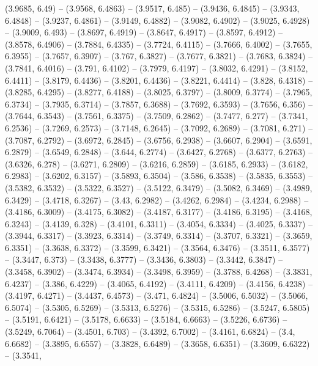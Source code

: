 {  (3.9685, 6.49) -- (3.9568, 6.4863) -- (3.9517, 6.485) -- (3.9436, 6.4845) -- 
  (3.9343, 6.4848) -- (3.9237, 6.4861) -- (3.9149, 6.4882) -- (3.9082, 6.4902) 
  -- (3.9025, 6.4928) -- (3.9009, 6.493) -- (3.8697, 6.4919) -- (3.8647, 6.4917)
   -- (3.8597, 6.4912) -- (3.8578, 6.4906) -- (3.7884, 6.4335) -- (3.7724, 
  6.4115) -- (3.7666, 6.4002) -- (3.7655, 6.3955) -- (3.7657, 6.3907) -- (3.767,
   6.3827) -- (3.7677, 6.3821) -- (3.7683, 6.3824) -- (3.7841, 6.4016) -- 
  (3.791, 6.4102) -- (3.7979, 6.4197) -- (3.8032, 6.4291) -- (3.8152, 6.4411) --
   (3.8179, 6.4436) -- (3.8201, 6.4436) -- (3.8221, 6.4414) -- (3.828, 6.4318) 
  -- (3.8285, 6.4295) -- (3.8277, 6.4188) -- (3.8025, 6.3797) -- (3.8009, 
  6.3774) -- (3.7965, 6.3734) -- (3.7935, 6.3714) -- (3.7857, 6.3688) -- 
  (3.7692, 6.3593) -- (3.7656, 6.356) -- (3.7644, 6.3543) -- (3.7561, 6.3375) --
   (3.7509, 6.2862) -- (3.7477, 6.277) -- (3.7341, 6.2536) -- (3.7269, 6.2573) 
  -- (3.7148, 6.2645) -- (3.7092, 6.2689) -- (3.7081, 6.271) -- (3.7087, 6.2792)
   -- (3.6972, 6.2845) -- (3.6756, 6.2938) -- (3.6607, 6.2904) -- (3.6591, 
  6.2879) -- (3.6549, 6.2848) -- (3.644, 6.2774) -- (3.6427, 6.2768) -- (3.6377,
   6.2763) -- (3.6326, 6.278) -- (3.6271, 6.2809) -- (3.6216, 6.2859) -- 
  (3.6185, 6.2933) -- (3.6182, 6.2983) -- (3.6202, 6.3157) -- (3.5893, 6.3504) 
  -- (3.586, 6.3538) -- (3.5835, 6.3553) -- (3.5382, 6.3532) -- (3.5322, 6.3527)
   -- (3.5122, 6.3479) -- (3.5082, 6.3469) -- (3.4989, 6.3429) -- (3.4718, 
  6.3267) -- (3.43, 6.2982) -- (3.4262, 6.2984) -- (3.4234, 6.2988) -- (3.4186, 
  6.3009) -- (3.4175, 6.3082) -- (3.4187, 6.3177) -- (3.4186, 6.3195) -- 
  (3.4168, 6.3243) -- (3.4139, 6.328) -- (3.4101, 6.3311) -- (3.4054, 6.3334) --
   (3.4025, 6.3337) -- (3.3944, 6.3317) -- (3.3923, 6.3314) -- (3.3749, 6.3314) 
  -- (3.3707, 6.3321) -- (3.3659, 6.3351) -- (3.3638, 6.3372) -- (3.3599, 
  6.3421) -- (3.3564, 6.3476) -- (3.3511, 6.3577) -- (3.3447, 6.373) -- (3.3438,
   6.3777) -- (3.3436, 6.3803) -- (3.3442, 6.3847) -- (3.3458, 6.3902) -- 
  (3.3474, 6.3934) -- (3.3498, 6.3959) -- (3.3788, 6.4268) -- (3.3831, 6.4237) 
  -- (3.386, 6.4229) -- (3.4065, 6.4192) -- (3.4111, 6.4209) -- (3.4156, 6.4238)
   -- (3.4197, 6.4271) -- (3.4437, 6.4573) -- (3.471, 6.4824) -- (3.5006, 
  6.5032) -- (3.5066, 6.5074) -- (3.5305, 6.5269) -- (3.5313, 6.5276) -- 
  (3.5315, 6.5286) -- (3.5247, 6.5805) -- (3.5191, 6.6421) -- (3.5178, 6.6633) 
  -- (3.5184, 6.6663) -- (3.5226, 6.6736) -- (3.5249, 6.7064) -- (3.4501, 6.703)
   -- (3.4392, 6.7002) -- (3.4161, 6.6824) -- (3.4, 6.6682) -- (3.3895, 6.6557) 
  -- (3.3828, 6.6489) -- (3.3658, 6.6351) -- (3.3609, 6.6322) -- (3.3541, 
}
